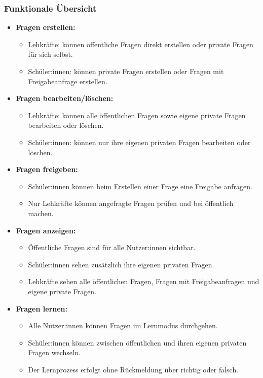 \subsubsection{Funktionale Übersicht}
\begin{itemize}
    \item \textbf{Fragen erstellen:}
    \begin{itemize}
        \item Lehkräfte: können öffentliche Fragen direkt erstellen oder private Fragen für sich selbst.
        \item Schüler:innen: können private Fragen erstellen oder Fragen mit Freigabeanfrage erstellen.
    \end{itemize}

    \item \textbf{Fragen bearbeiten/löschen:}
    \begin{itemize}
        \item Lehkräfte: können alle öffentlichen Fragen sowie eigene private Fragen bearbeiten oder löschen.
        \item Schüler:innen: können nur ihre eigenen privaten Fragen bearbeiten oder löschen.
    \end{itemize}

    \item \textbf{Fragen freigeben:}
    \begin{itemize}
        \item Schüler:innen können beim Erstellen einer Frage eine Freigabe anfragen.
        \item Nur Lehkräfte können angefragte Fragen prüfen und bei öffentlich machen.
    \end{itemize}

    \item \textbf{Fragen anzeigen:}
    \begin{itemize}
        \item Öffentliche Fragen sind für alle Nutzer:innen sichtbar.
        \item Schüler:innen sehen zusätzlich ihre eigenen privaten Fragen.
        \item Lehkräfte sehen alle öffentlichen Fragen, Fragen mit Freigabeanfragen und eigene private Fragen.
    \end{itemize}

    \item \textbf{Fragen lernen:}
    \begin{itemize}
        \item Alle Nutzer:innen können Fragen im Lernmodus durchgehen.
        \item Schüler:innen können zwischen öffentlichen und ihren eigenen privaten Fragen wechseln.
        \item Der Lernprozess erfolgt ohne Rückmeldung über richtig oder falsch.
    \end{itemize}
\end{itemize}